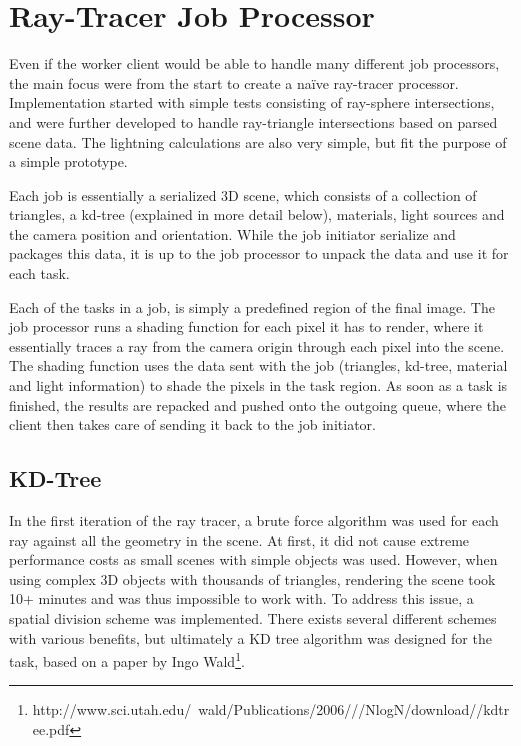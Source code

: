 

\section{Ray-Tracer Job Processor}
Even if the worker client would be able to handle many different job processors, the main focus were from the start to create a naïve ray-tracer processor. Implementation started with simple tests consisting of ray-sphere intersections, and were further developed to handle ray-triangle intersections based on parsed scene data. The lightning calculations are also very simple, but fit the purpose of a simple prototype.

Each job is essentially a serialized 3D scene, which consists of a collection of triangles, a kd-tree (explained in more detail below), materials, light sources and the camera position and orientation. While the job initiator serialize and packages this data, it is up to the job processor to unpack the data and use it for each task.

Each of the tasks in a job, is simply a predefined region of the final image. The job processor runs a shading function for each pixel it has to render, where it essentially traces a ray from the camera origin through each pixel into the scene. The shading function uses the data sent with the job (triangles, kd-tree, material and light information) to shade the pixels in the task region. As soon as a task is finished, the results are repacked and pushed onto the outgoing queue, where the client then takes care of sending it back to the job initiator.

\subsection{KD-Tree}
In the first iteration of the ray tracer, a brute force algorithm was used for each ray against all the geometry in the scene. At first, it did not cause extreme performance costs as small scenes with simple objects was used. However, when using complex 3D objects with thousands of triangles, rendering the scene took 10+ minutes and was thus impossible to work with. To address this issue, a spatial division scheme was implemented. There exists several different schemes with various benefits, but ultimately a KD tree algorithm was designed for the task, based on a paper by Ingo Wald\footnote{http://www.sci.utah.edu/~wald/Publications/2006///NlogN/download//kdtree.pdf}. 

